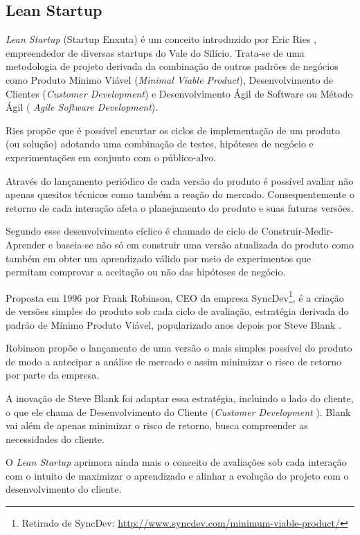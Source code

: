 \subsection{Lean Startup}
\par \emph{Lean Startup} (Startup Enxuta) é um conceito introduzido por Eric Ries  \citep{ries:11}, empreendedor de diversas startups do Vale do Silício. Trata-se de uma metodologia de projeto derivada da combinação de outros padrões de negócios como Produto Mínimo Viável (\emph{Minimal Viable Product}), Desenvolvimento de Clientes (\emph{Customer Development}) e Desenvolvimento Ágil de Software ou Método Ágil ( \emph{Agile Software Development}).
\par Ries propõe que é possível encurtar os ciclos de implementação de um produto (ou solução) adotando uma combinação de testes, hipóteses de negócio e experimentações em conjunto com o público-alvo.
\par Através do lançamento periódico de cada versão do produto é possível avaliar não apenas quesitos técnicos como também a reação do mercado. Consequentemente o retorno de cada interação afeta o planejamento do produto e suas futuras versões.
\par Segundo \cite{ries:11} esse desenvolvimento cíclico é chamado de ciclo de Construir-Medir-Aprender e baseia-se não só em construir uma versão atualizada do produto como também em obter um aprendizado válido por meio de experimentos que permitam comprovar a aceitação ou não das hipóteses de negócio.
\par Proposta em 1996 por Frank Robinson, CEO da empresa SyncDev\footnote{ Retirado de SyncDev: \url{http://www.syncdev.com/minimum-viable-product/}}, é a criação de versões simples do produto sob cada ciclo de avaliação, estratégia derivada do padrão de Mínimo Produto Viável, popularizado anos depois por Steve Blank \citep{junk:2000}.
\par Robinson propõe o lançamento de uma versão o mais simples possível do produto de modo a antecipar a análise de mercado e assim minimizar o risco de retorno por parte da empresa.
\par A inovação de Steve Blank foi adaptar essa estratégia, incluindo o lado do cliente, o que ele chama de Desenvolvimento do Cliente (\emph{Customer Development} ). Blank vai além de apenas minimizar o risco de retorno, busca compreender as necessidades do cliente.
\par O \emph{Lean Startup} aprimora ainda mais o conceito de avaliações sob cada interação com o intuito de maximizar o aprendizado e alinhar a evolução do projeto com o desenvolvimento do cliente.

